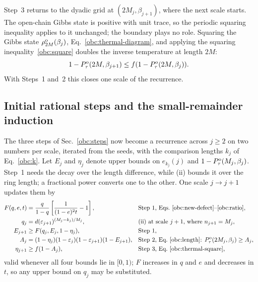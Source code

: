 Step~3 returns to the dyadic grid at $(2M_j,\beta_{j+1})$, where the
next scale starts. The open-chain Gibbs state is positive with unit
trace, so the periodic squaring inequality applies to it unchanged; the
boundary plays no role. Squaring the Gibbs state $\rho_{2M}^{\mathrm{o}}(\beta_j)$,
Eq.~\eqref{obc:thermal-diagram}, and applying the squaring
inequality~\eqref{obc:square} doubles the inverse temperature at length
$2M$:
\begin{equation}
    1-P_{\tau}^{\mathrm{o}}(2M,\beta_{j+1})
    \le f(1-P_{\tau}^{\mathrm{o}}(2M,\beta_j)).
    \label{obc:thermal-square}
\end{equation}
With Steps~1 and~2 this closes one scale of the recurrence.

\subsection{Initial rational steps and the small-remainder induction}
\label{obc:initialization}

The three steps of Sec.~\ref{obc:steps} now become a recurrence across
$j\ge2$ on two numbers per scale, iterated from the seeds, with the
comparison lengths $k_j$ of Eq.~\eqref{obc:k}.
Let $E_j$ and $\eta_j$ denote upper bounds on $e_{k_j}(j)$ and
$1-P_{\tau}^{\mathrm{o}}(M_j,\beta_j)$. Step~1 needs the decay over the length
difference, while (ii) bounds it over the ring length; a fractional
power converts one to the other. One scale $j\to j+1$ updates them by%
~
\begin{align}
    F(q,e,t)   &=\frac{q}{1-q}
    \left[\frac{1}{(1-e)^2t}-1\right],
               &                                       &\text{Step 1, Eqs.~\eqref{obc:new-defect}--\eqref{obc:ratio}},\notag\\
    q_j        &=d(\varepsilon_{j+1})^{(M_j-k_j)/M_j},
               &                                       &\text{(ii) at scale $j+1$, where $n_{j+1}=M_j$},\notag\\
    E_{j+1}    &\ge F(q_j,E_j,1-\eta_j),
               &                                       &\text{Step 1},\notag\\
    A_j        &=(1-\eta_j)(1-\varepsilon_j)
    (1-\varepsilon_{j+1})(1-E_{j+1}),
               &                                       &\text{Step 2, Eq.~\eqref{obc:length}: }P_{\tau}^{\mathrm{o}}(2M_j,\beta_j)\ge A_j,\notag\\
    \eta_{j+1} &\ge f(1-A_j),
               &                                       &\text{Step 3, Eq.~\eqref{obc:thermal-square}},
    \label{obc:updates}
\end{align}
valid whenever all four bounds lie in $[0,1)$; $F$ increases in $q$
and $e$ and decreases in $t$, so any upper bound on $q_j$ may be
substituted.

